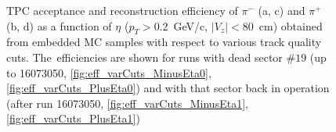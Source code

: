 \begin{figure}[h!]
{\begin{subfigure}[b]{\linewidth}
		\end{subfigure}
	}%
	\parbox{0.49\textwidth}{
		\centering
		\begin{subfigure}[b]{\linewidth}\centering
		\end{subfigure}
	}
	\caption[TPC acceptance and reconstruction efficiency of $\pi^{-}$ and $\pi^+$ as a function of $\eta$ obtained from embedded MC samples with respect to various track quality cuts.]{TPC acceptance and reconstruction efficiency of $\pi^{-}$ (a, c) and $\pi^+$ (b, d) as a function of $\eta$ ($p_T>0.2$~GeV/c, $|V_z|<80$~cm) obtained from embedded MC samples with respect to various track quality cuts. The~efficiencies are shown for runs with dead sector $\#19$ (up to 16073050, \ref{fig:eff_varCuts_MinusEta0},\ref{fig:eff_varCuts_PlusEta0}) and with that sector back in operation (after run 16073050, \ref{fig:eff_varCuts_MinusEta1},\ref{fig:eff_varCuts_PlusEta1})}\label{fig:tpcEff_VarCuts_eta}
\end{figure}

